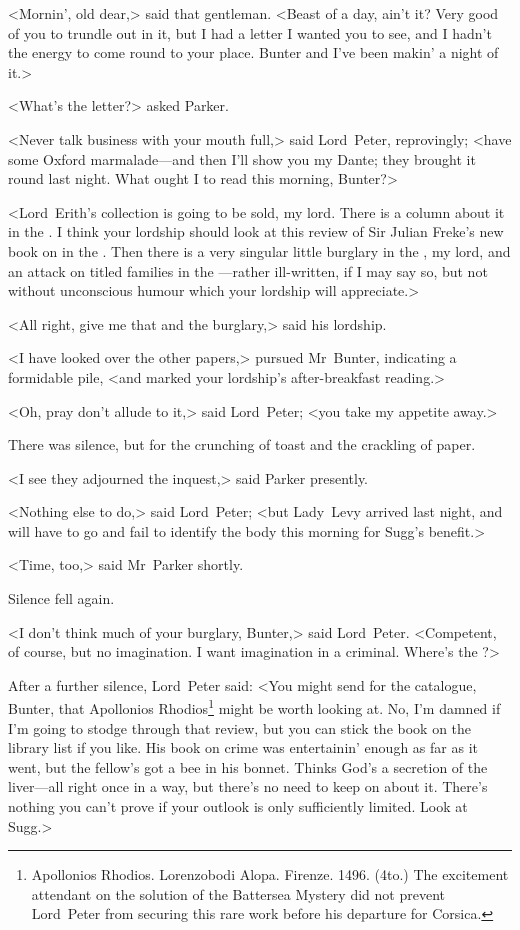 <Mornin', old dear,> said that gentleman. <Beast of a day, ain't it? Very good of you to trundle out in it, but I had a letter I wanted you to see, and I hadn't the energy to come round to your place. Bunter and I've been makin' a night of it.>

<What's the letter?> asked Parker.

<Never talk business with your mouth full,> said Lord~Peter, reprovingly; <have some Oxford marmalade—and then I'll show you my Dante; they brought it round last night. What ought I to read this morning, Bunter?>

<Lord~Erith's collection is going to be sold, my lord. There is a column about it in the . I think your lordship should look at this review of Sir Julian Freke's new book on  in the . Then there is a very singular little burglary in the , my lord, and an attack on titled families in the —rather ill-written, if I may say so, but not without unconscious humour which your lordship will appreciate.>

<All right, give me that and the burglary,> said his lordship.

<I have looked over the other papers,> pursued Mr~Bunter, indicating a formidable pile, <and marked your lordship's after-breakfast reading.>

<Oh, pray don't allude to it,> said Lord~Peter; <you take my appetite away.>

There was silence, but for the crunching of toast and the crackling of paper.

<I see they adjourned the inquest,> said Parker presently.

<Nothing else to do,> said Lord~Peter; <but Lady~Levy arrived last night, and will have to go and fail to identify the body this morning for Sugg's benefit.>

<Time, too,> said Mr~Parker shortly.

Silence fell again.

<I don't think much of your burglary, Bunter,> said Lord~Peter. <Competent, of course, but no imagination. I want imagination in a criminal. Where's the ?>

After a further silence, Lord~Peter said: <You might send for the catalogue, Bunter, that Apollonios Rhodios\footnote{Apollonios Rhodios. Lorenzobodi Alopa. Firenze. 1496. (4to.) The excitement attendant on the solution of the Battersea Mystery did not prevent Lord~Peter from securing this rare work before his departure for Corsica.} might be worth looking at. No, I'm damned if I'm going to stodge through that review, but you can stick the book on the library list if you like. His book on crime was entertainin' enough as far as it went, but the fellow's got a bee in his bonnet. Thinks God's a secretion of the liver—all right once in a way, but there's no need to keep on about it. There's nothing you can't prove if your outlook is only sufficiently limited. Look at Sugg.>


